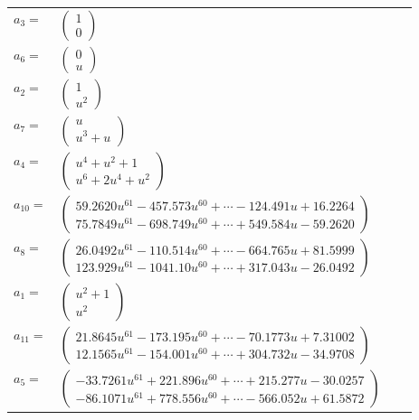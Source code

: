 \documentclass[1p]{elsarticle_modified}
\theoremstyle{definition}
\begin{document}
\begin{tabular}{m{7pt} m{180pt} m{7pt} m{180pt} }
\flushright $a_{3}=$&$\begin{pmatrix}1\\0\end{pmatrix}$ \\
\flushright $a_{6}=$&$\begin{pmatrix}0\\u\end{pmatrix}$ \\
\flushright $a_{2}=$&$\begin{pmatrix}1\\u^2\end{pmatrix}$ \\
\flushright $a_{7}=$&$\begin{pmatrix}u\\u^3+u\end{pmatrix}$ \\
\flushright $a_{4}=$&$\begin{pmatrix}u^4+u^2+1\\u^6+2 u^4+u^2\end{pmatrix}$ \\
\flushright $a_{10}=$&$\begin{pmatrix}59.2620 u^{61}-457.573 u^{60}+\cdots-124.491 u+16.2264\\75.7849 u^{61}-698.749 u^{60}+\cdots+549.584 u-59.2620\end{pmatrix}$ \\
\flushright $a_{8}=$&$\begin{pmatrix}26.0492 u^{61}-110.514 u^{60}+\cdots-664.765 u+81.5999\\123.929 u^{61}-1041.10 u^{60}+\cdots+317.043 u-26.0492\end{pmatrix}$ \\
\flushright $a_{1}=$&$\begin{pmatrix}u^2+1\\u^2\end{pmatrix}$ \\
\flushright $a_{11}=$&$\begin{pmatrix}21.8645 u^{61}-173.195 u^{60}+\cdots-70.1773 u+7.31002\\12.1565 u^{61}-154.001 u^{60}+\cdots+304.732 u-34.9708\end{pmatrix}$ \\
\flushright $a_{5}=$&$\begin{pmatrix}-33.7261 u^{61}+221.896 u^{60}+\cdots+215.277 u-30.0257\\-86.1071 u^{61}+778.556 u^{60}+\cdots-566.052 u+61.5872\end{pmatrix}$ \\

\end{tabular}
\end{document}
